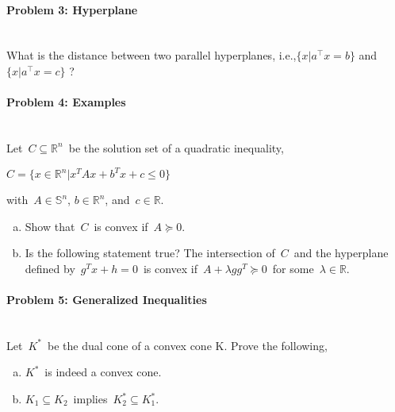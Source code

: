 \documentclass[a4paper]{article}
\newenvironment{solution}
{\color{blue} \paragraph{Solution.}}
{\newline \qed}
\begin{document}

\paragraph{Problem 3: Hyperplane}
~\\

\noindent
What is the distance between two parallel hyperplanes, i.e.,$\{x|a^\top x=b\}$ and $\{x|a^\top x=c\}$ ?


\paragraph{Problem 4: Examples}
~\\

\noindent
Let~$C \subseteq \mathbb{R}^n$~be the solution set of a quadratic inequality,
\begin{center}
$C = \{x \in \mathbb{R}^n|x^TAx + b^Tx + c \leqslant 0\}$
\end{center}
with~$A \in \mathbb{S}^n$, $b \in \mathbb{R}^n$, and~$c \in \mathbb{R}$.
\begin{enumerate}[a)]
    \item Show that~$C$~is convex if~$A \succeq 0$.

    \item Is the following statement true? The intersection of~$C$~and the hyperplane defined by~$g^Tx+h=0$~is convex if~$A+\lambda gg^T \succeq 0$~for some~$\lambda \in \mathbb{R}$.
\end{enumerate}


\paragraph{Problem 5: Generalized Inequalities}
~\\

\noindent
Let~$K^*$~be the dual cone of a convex cone K. Prove the following,
\begin{enumerate}[a)]
    \item $K^*$~is indeed a convex cone.

    \item $K_1 \subseteq K_2$~implies~$K^*_2 \subseteq K^*_1$.

\end{enumerate}
\end{document}
